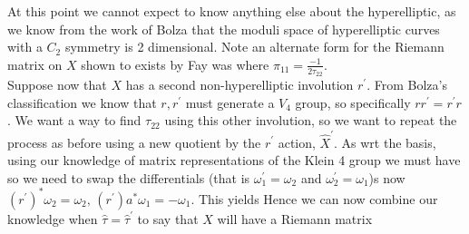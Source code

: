 \documentclass{article}
\begin{document}
At this point we cannot expect to know anything else about the hyperelliptic, as we know from the work of Bolza that the moduli space of hyperelliptic curves with a $C_2$ symmetry is 2 dimensional. Note an alternate form for the Riemann matrix on $X$ shown to exists by Fay was 
where $\pi_{11} = \frac{-1}{2\tau_{22}}$. \\
Suppose now that $X$ has a second non-hyperelliptic involution $r^\prime$. From Bolza's classification we know that $r,r^\prime$ must generate a $V_4$ group, so specifically $rr^\prime = r^\prime r$. We want a way to find $\tau_{22}$ using this other involution, so we want to repeat the process as before using  a new quotient by the $r^\prime$ action, $\hat{X}^\prime$. As 
wrt the basis, using our knowledge of matrix representations of the Klein 4 group we must have 
so we need to swap the differentials (that is $\omega_1^\prime = \omega_2$ and $\omega_2^\prime = \omega_1$)s now $(r^\prime)^\ast \omega_2 = \omega_2, \, (r^\prime) a^\ast \omega_1 = -\omega_1$. This yields 
Hence we can now combine our knowledge when $\hat{\tau} = \hat{\tau}^\prime$ to say that $X$ will have a Riemann matrix


\end{document}
